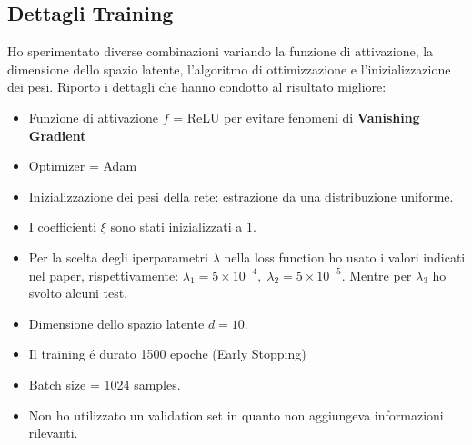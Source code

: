 \documentclass[11pt]{article}
\begin{document}
\subsection{Dettagli Training}
Ho sperimentato diverse combinazioni variando la funzione di attivazione, la dimensione dello spazio latente, l'algoritmo di ottimizzazione e l'inizializzazione dei pesi. Riporto i dettagli che hanno condotto al risultato migliore:
\begin{itemize}
	\item Funzione di attivazione $f$ = ReLU per evitare fenomeni di \textbf{Vanishing Gradient}
	\item Optimizer = Adam
	\item Inizializzazione dei pesi della rete: estrazione da una distribuzione uniforme.
	\item I coefficienti $\xi$ sono stati inizializzati a $1$.
	\item Per la scelta degli iperparametri $\lambda$ nella loss function ho usato i valori indicati nel paper, rispettivamente:
$\lambda_1 = 5  \times  10^{-4},\; \lambda_2 = 5 \times 10^{-5}$. Mentre per $\lambda_3$ ho svolto alcuni test.
	\item Dimensione dello spazio latente $d = 10$.
	\item Il training é durato 1500 epoche (Early Stopping)
	\item Batch size = 1024 samples.
	\item Non ho utilizzato un validation set in quanto non aggiungeva informazioni rilevanti.
\end{itemize}
\end{document}
